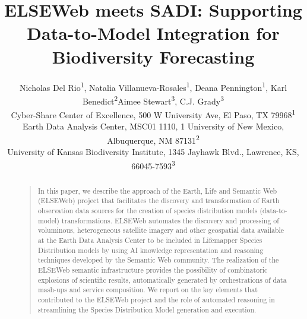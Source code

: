 \documentclass[letterpaper]{article}
\begin{document}
%
\title{ELSEWeb meets SADI: Supporting Data-to-Model Integration for Biodiversity Forecasting}
\author{Nicholas Del Rio\textsuperscript{1}, Natalia Villanueva-Rosales\textsuperscript{1}, Deana Pennington\textsuperscript{1}, Karl Benedict\textsuperscript{2}\AND Aimee Stewart\textsuperscript{3}, C.J. Grady\textsuperscript{3}\\ 
Cyber-Share Center of Excellence, 500 W University Ave, El Paso, TX 79968\textsuperscript{1}\\
Earth Data Analysis Center, MSC01 1110, 1 University of New Mexico, Albuquerque, NM 87131\textsuperscript{2}\\
University of Kansas Biodiversity Institute, 1345 Jayhawk Blvd., Lawrence, KS, 66045-7593\textsuperscript{3}
}
\maketitle
\begin{abstract}
\begin{quote}
In this paper, we describe the approach of the Earth, Life and Semantic Web (ELSEWeb) project that facilitates the discovery and transformation of Earth observation data sources for the creation of species distribution models (data-to-model) transformations. ELSEWeb automates the discovery and processing of voluminous, heterogeneous satellite imagery and other geospatial data available at the Earth Data Analysis Center to be included in Lifemapper Species Distribution models by using AI knowledge representation and reasoning techniques developed by the Semantic Web community. The realization of the ELSEWeb semantic infrastructure provides the possibility of combinatoric explosions of scientific results, automatically generated by orchestrations of data mash-ups and service composition. We report on the key elements that contributed to the ELSEWeb project and the role of automated reasoning in streamlining the Species Distribution Model generation and execution.
\end{quote}
\end{abstract}
\end{document}
